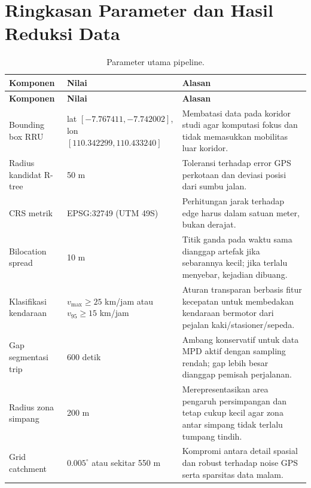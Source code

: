 \documentclass[11pt,a4paper]{article}
\begin{document}
\section{Ringkasan Parameter dan Hasil Reduksi Data}
\begin{longtable}{p{}p{}p{}}
\caption{Parameter utama pipeline.}\\
\toprule
\textbf{Komponen} & \textbf{Nilai} & \textbf{Alasan}\\
\midrule
\endfirsthead
\toprule
\textbf{Komponen} & \textbf{Nilai} & \textbf{Alasan}\\
\midrule
\endhead
Bounding box RRU & lat $[-7.767411,-7.742002]$, lon $[110.342299,110.433240]$ & Membatasi data pada koridor studi agar komputasi fokus dan tidak memasukkan mobilitas luar koridor.\\
Radius kandidat R-tree & 50 m & Toleransi terhadap error GPS perkotaan dan deviasi posisi dari sumbu jalan.\\
CRS metrik & EPSG:32749 (UTM 49S) & Perhitungan jarak terhadap edge harus dalam satuan meter, bukan derajat.\\
Bilocation spread & 10 m & Titik ganda pada waktu sama dianggap artefak jika sebarannya kecil; jika terlalu menyebar, kejadian dibuang.\\
Klasifikasi kendaraan & $v_{\max}\geq 25$ km/jam atau $v_{95}\geq 15$ km/jam & Aturan transparan berbasis fitur kecepatan untuk membedakan kendaraan bermotor dari pejalan kaki/stasioner/sepeda.\\
Gap segmentasi trip & 600 detik & Ambang konservatif untuk data MPD aktif dengan sampling rendah; gap lebih besar dianggap pemisah perjalanan.\\
Radius zona simpang & 200 m & Merepresentasikan area pengaruh persimpangan dan tetap cukup kecil agar zona antar simpang tidak terlalu tumpang tindih.\\
Grid catchment & $0.005^\circ$ atau sekitar 550 m & Kompromi antara detail spasial dan robust terhadap noise GPS serta sparsitas data malam.\\
\bottomrule
\end{longtable}
\end{document}
